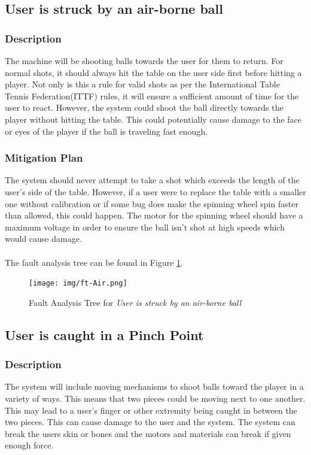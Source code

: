 \documentclass[11pt]{article}
\begin{document}
\subsection{User is struck by an air-borne ball}
\subsubsection*{Description}
The machine will be shooting balls towards the user for them to return. For normal shots, it should always hit the table on the user side first before hitting a player. Not only is this a rule for valid shots as per the International Table Tennis Federation(ITTF) rules, it will ensure a sufficient amount of time for the user to react. However, the system could shoot the ball directly towards the player without hitting the table. This could potentially cause damage to the face or eyes of the player if the ball is traveling fast enough.
\subsubsection*{Mitigation Plan}
The system should never attempt to take a shot which exceeds the length of the user's side of the table. However, if a user were to replace the table with a smaller one without calibration or if some bug does make the spinning wheel spin faster than allowed, this could happen. The motor for the spinning wheel should have a maximum voltage in order to ensure the ball isn't shot at high speeds which would cause damage. \\ \\
The fault analysis tree can be found in Figure \ref{fig:ft-Air}.
\begin{figure}[H]
   \centering
   \texttt{[image: img/ft-Air.png]} %
   \caption{Fault Analysis Tree for \textit{User is struck by an air-borne ball}}
   \label{fig:ft-Air}
\end{figure}

\subsection{User is caught in a Pinch Point}
\subsubsection*{Description}
The system will include moving mechanisms to shoot balls toward the player in a variety of ways. This means that two pieces could be moving next to one another. This may lead to a user's finger or other extremity being caught in between the two pieces. This can cause damage to the user and the system. The system can break the users skin or bones and the motors and materials can break if given enough force.
\end{document}
